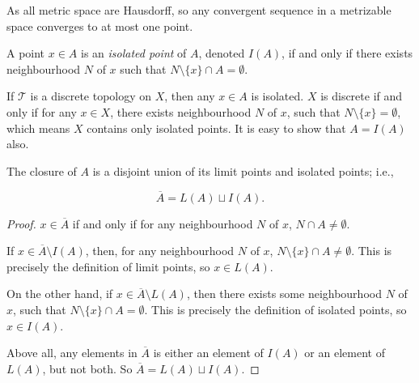 \begin{note}
	As all metric space are Hausdorff, so any convergent sequence in a metrizable space converges to at most one point.
\end{note}


\begin{definition}
	A point $x \in A$ is an \textit{isolated point} of $A$, denoted $I(A)$, if and only if there exists neighbourhood $N$ of $x$ such that $N \setminus \{x\} \cap A = \emptyset$.
\end{definition}


\begin{example}
	If $\mathcal T$ is a discrete topology on $X$, then any $x \in A$ is isolated. $X$ is discrete if and only if for any $x \in X$, there exists neighbourhood $N$ of $x$, such that $N \setminus \{x\} = \emptyset$, which means $X$ contains only isolated points. It is easy to show that $A = I(A)$ also.
\end{example}


\begin{proposition}
	The closure of $A$ is a disjoint union of its limit points and isolated points; i.e.,

	$$
	\overline A = L(A) \sqcup I(A).
	$$
	
	\begin{proof}
		$x \in \overline A$ if and only if for any neighbourhood $N$ of $x$, $N \cap A \ne \emptyset$.
		
		
		If $x \in \overline A \setminus I(A)$, then, for any neighbourhood $N$ of $x$, $N \setminus \{x\} \cap A \ne \emptyset$. This is precisely the definition of limit points, so $x \in L(A)$.
		
		On the other hand, if $x \in \overline A \setminus L(A)$, then there exists some neighbourhood $N$ of $x$, such that $N \setminus \{x\} \cap A = \emptyset$. This is precisely the definition of isolated points, so $x \in I(A)$.
		
		Above all, any elements in $\overline A$ is either an element of $I(A)$ or an element of $L(A)$, but not both. So $\overline A = L(A) \sqcup I(A)$.
	\end{proof}
\end{proposition}


